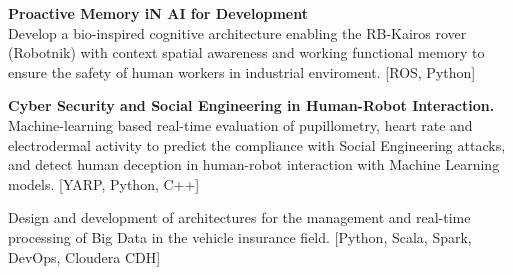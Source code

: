\documentclass[10pt,a4paper,ragged2e]{altacv}
\begin{document}


\begin{fullwidth}
\makecvheader
\end{fullwidth}



\textbf{Proactive Memory iN AI for Development}\\
Develop a bio-inspired cognitive architecture enabling the RB-Kairos rover (Robotnik) with context spatial awareness and working functional memory to ensure the safety of human workers in industrial enviroment. [ROS, Python]

\divider

\textbf{Cyber Security and Social Engineering in Human-Robot Interaction.}\\
Machine-learning based real-time evaluation of pupillometry, heart rate and electrodermal activity to predict the compliance with Social Engineering attacks, and detect human deception in human-robot interaction with Machine Learning models. [YARP, Python, C++]

\divider

Design and development of architectures for the management and real-time processing of Big Data in the vehicle insurance field. [Python, Scala, Spark, DevOps, Cloudera CDH]


\end{document}
